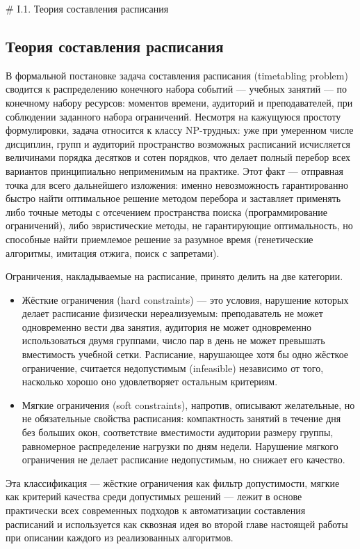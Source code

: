 # I.1. Теория составления расписания
\subsection{Теория составления расписания}
В формальной постановке задача составления расписания (timetabling problem) сводится к распределению конечного набора событий — учебных занятий — по конечному набору ресурсов: моментов времени, аудиторий и преподавателей, при соблюдении заданного набора ограничений. Несмотря на кажущуюся простоту формулировки, задача относится к классу NP-трудных: уже при умеренном числе дисциплин, групп и аудиторий пространство возможных расписаний исчисляется величинами порядка десятков и сотен порядков, что делает полный перебор всех вариантов принципиально неприменимым на практике. Этот факт — отправная точка для всего дальнейшего изложения: именно невозможность гарантированно быстро найти оптимальное решение методом перебора и заставляет применять либо точные методы с отсечением пространства поиска (программирование ограничений), либо эвристические методы, не гарантирующие оптимальность, но способные найти приемлемое решение за разумное время (генетические алгоритмы, имитация отжига, поиск с запретами).

Ограничения, накладываемые на расписание, принято делить на две категории.
\begin{itemize}
\item Жёсткие ограничения (hard constraints) — это условия, нарушение которых делает расписание физически нереализуемым: преподаватель не может одновременно вести два занятия, аудитория не может одновременно использоваться двумя группами, число пар в день не может превышать вместимость учебной сетки. Расписание, нарушающее хотя бы одно жёсткое ограничение, считается недопустимым (infeasible) независимо от того, насколько хорошо оно удовлетворяет остальным критериям. 
\item Мягкие ограничения (soft constraints), напротив, описывают желательные, но не обязательные свойства расписания: компактность занятий в течение дня без больших окон, соответствие вместимости аудитории размеру группы, равномерное распределение нагрузки по дням недели. Нарушение мягкого ограничения не делает расписание недопустимым, но снижает его качество. 
\end{itemize}

Эта классификация — жёсткие ограничения как фильтр допустимости, мягкие как критерий качества среди допустимых решений — лежит в основе практически всех современных подходов к автоматизации составления расписаний и используется как сквозная идея во второй главе настоящей работы при описании каждого из реализованных алгоритмов.

